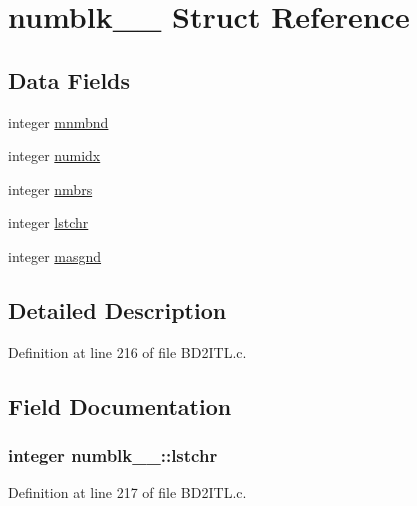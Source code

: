 \hypertarget{structnumblk__1__}{}\section{numblk\+\_\+\_\+ Struct Reference}
\label{structnumblk__1__}
\subsection*{Data Fields}
\begin{DoxyCompactItemize}
\item 
integer \hyperlink{structnumblk__1___a0b97e1e4f394909609eed186f4797bf3}{mnmbnd}
\item 
integer \hyperlink{structnumblk__1___a6aef8abc70f1a5323ca22a2092acb15d}{numidx}
\item 
integer \hyperlink{structnumblk__1___a054d3628bbe6eeeef320b7ac27b3c111}{nmbrs}
\item 
integer \hyperlink{structnumblk__1___a7f3d6c5a7b3af564a0f9cf3cfe2e6ee9}{lstchr}
\item 
integer \hyperlink{structnumblk__1___a7a6517f63691ed178f4972441a04e4d7}{masgnd}
\end{DoxyCompactItemize}


\subsection{Detailed Description}


Definition at line 216 of file B\+D2\+I\+T\+L.\+c.



\subsection{Field Documentation}
\subsubsection[{\texorpdfstring{lstchr}{lstchr}}]{\setlength{\rightskip}{0pt plus 5cm}integer numblk\+\_\+\_\+\+::lstchr}\hypertarget{structnumblk__1___a7f3d6c5a7b3af564a0f9cf3cfe2e6ee9}{}\label{structnumblk__1___a7f3d6c5a7b3af564a0f9cf3cfe2e6ee9}


Definition at line 217 of file B\+D2\+I\+T\+L.\+c.

